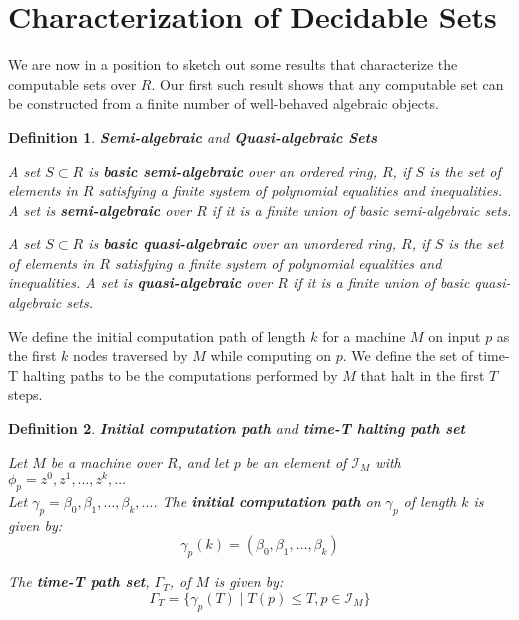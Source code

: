 \documentclass[twoside]{article}
\newcommand{\set}[1]{\{#1\}}
\newcommand{\inspace}[0]{\mathcal{I}}
\newcommand{\compute}[0]{\phi}
\newcommand{\haltpaths}[1]{\Gamma_{#1}}
\newcommand{\computepath}[0]{\gamma}
\newtheorem{definition}{Definition}[section]
\begin{document}
\section{Characterization of Decidable Sets}

  We are now in a position to sketch out some results that
  characterize the computable sets over $R$.  Our first such result
  shows that any computable set can be constructed from a finite number
  of well-behaved algebraic objects.
  
  \begin{definition}{\textbf{Semi-algebraic} and \textbf{Quasi-algebraic Sets}}
    
    A set $S \subset R$ is \textbf{basic semi-algebraic} over an
    ordered ring, $R$, if $S$ is the set of elements in $R$ satisfying
    a finite system of polynomial equalities and inequalities. A set
    is \textbf{semi-algebraic} over $R$ if it is a finite union of basic
    semi-algebraic sets.
    
    A set $S \subset R$ is \textbf{basic quasi-algebraic} over an
    unordered ring, $R$, if $S$ is the set of elements in $R$ satisfying
    a finite system of polynomial equalities and inequalities. A set
    is \textbf{quasi-algebraic} over $R$ if it is a finite union of basic
    quasi-algebraic sets.
    
  \end{definition}

  We define the initial computation path of length $k$ for a machine
  $M$ on input $p$ as the first $k$ nodes traversed by $M$ while computing
  on $p$.  We define the set of time-T halting paths to be the computations
  performed by $M$ that halt in the first $T$ steps.

  \begin{definition}{\textbf{Initial computation path} and \textbf{time-T halting path set}}

    Let $M$ be a machine over $R$, and let $p$ be an element of
    $\inspace_M$ with $\compute_p = z^0, z^1, \ldots, z^k, \ldots$ \\
    Let $\computepath_p = \beta_0, \beta_1, \ldots, \beta_k, \ldots$.  
    The \textbf{initial computation path} on $\computepath_p$ of
    length $k$ is given by: 
    $$\computepath_p(k) = (\beta_0, \beta_1, \ldots,\beta_k)$$

    The \textbf{time-T path set}, $\haltpaths{T}$, of $M$ is given by:
    $$\haltpaths{T} = \set{\computepath_p(T) \mid T(p) \leq T, p \in \inspace_M}$$

  \end{definition}
  
\end{document}
